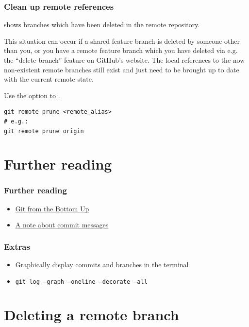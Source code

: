 \documentclass{git_course}
\begin{document}
\begin{frame}[fragile]
    \frametitle{Clean up remote references}

      shows branches which have been
    deleted in the remote repository.

    This situation can occur if a shared feature branch is deleted by
    someone other than you, or you have a remote feature branch which you
    have deleted via e.g. the ``delete branch'' feature on GitHub's website.
    The local references to the now non-existent remote branches still exist
    and just need to be brought up to date with the current remote state.

     Use the  option to .

\begin{lstlisting}
git remote prune <remote_alias>
# e.g.:
git remote prune origin
\end{lstlisting}
\end{frame}

\section{Further reading}

\begin{frame}
\frametitle{Further reading}
\begin{itemize}
    \item \href{http://jwiegley.github.io/git-from-the-bottom-up/}{Git from the Bottom Up}
    \item \href{http://tbaggery.com/2008/04/19/a-note-about-git-commit-messages.html}
               {A note about commit messages}
\end{itemize}
\end{frame}

\begin{frame}
    \frametitle{Extras}
    \begin{itemize}
        \item Graphically display commits and branches in the terminal
        \item \texttt{git log --graph --oneline --decorate --all}
    \end{itemize}
\end{frame}

\section{Deleting a remote branch}
\end{document}
